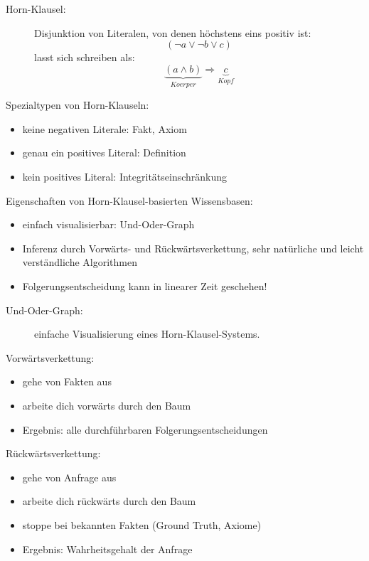 \begin{description}
\item[Horn-Klausel:] Disjunktion von Literalen, von denen höchstens eins positiv ist: $$(\neg a \vee \neg b \vee c)$$ lasst sich schreiben als: $$\underbrace{(a \wedge b)}_{Koerper} \Rightarrow \underbrace{c}_{Kopf}$$
\end{description}
Spezialtypen von Horn-Klauseln:
\begin{itemize}
\item keine negativen Literale: Fakt, Axiom
\item genau ein positives Literal: Definition
\item kein positives Literal: Integritätseinschränkung
\end{itemize}
Eigenschaften von Horn-Klausel-basierten Wissensbasen:
\begin{itemize}
\item einfach visualisierbar: Und-Oder-Graph
\item Inferenz durch Vorwärts- und Rückwärtsverkettung, sehr natürliche und leicht verständliche Algorithmen
\item Folgerungsentscheidung kann in linearer Zeit geschehen!
\end{itemize}
\begin{description}
\item[Und-Oder-Graph:] einfache Visualisierung eines Horn-Klausel-Systems.
\end{description}


Vorwärtsverkettung:
\begin{itemize}
\item gehe von Fakten aus
\item arbeite dich vorwärts durch den Baum
\item Ergebnis: alle durchführbaren Folgerungsentscheidungen
\end{itemize}
Rückwärtsverkettung:
\begin{itemize}
\item gehe von Anfrage aus
\item arbeite dich rückwärts durch den Baum
\item stoppe bei bekannten Fakten (Ground Truth, Axiome)
\item Ergebnis: Wahrheitsgehalt der Anfrage
\end{itemize}
